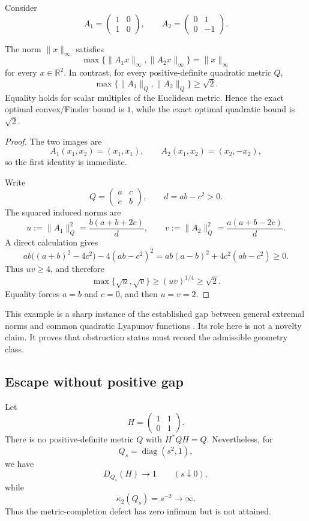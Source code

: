 Consider
\[
 A_1=\begin{pmatrix}1&0\\1&0\end{pmatrix},
 \qquad
 A_2=\begin{pmatrix}0&1\\0&-1\end{pmatrix}.
\]

\begin{theorem}
\label{thm:block19-convex-quadratic-separation}
The norm \(\|x\|_\infty\) satisfies
\[
 \max\{\|A_1x\|_\infty,\|A_2x\|_\infty\}
 =\|x\|_\infty
\]
for every \(x\in\mathbb R^2\).  In contrast, for every positive-definite quadratic metric \(Q\),
\[
 \max\{\|A_1\|_Q,\|A_2\|_Q\}\geq\sqrt2.
\]
Equality holds for scalar multiples of the Euclidean metric.  Hence the exact optimal convex/Finsler bound is \(1\), while the exact optimal quadratic bound is \(\sqrt2\).
\end{theorem}

\begin{proof}
The two images are
\[
 A_1(x_1,x_2)=(x_1,x_1),
 \qquad
 A_2(x_1,x_2)=(x_2,-x_2),
\]
so the first identity is immediate.

Write
\[
 Q=\begin{pmatrix}a&c\\c&b\end{pmatrix},
 \qquad
 d=ab-c^2>0.
\]
The squared induced norms are
\[
 u:=\|A_1\|_Q^2
 =\frac{b(a+b+2c)}{d},
 \qquad
 v:=\|A_2\|_Q^2
 =\frac{a(a+b-2c)}{d}.
\]
A direct calculation gives
\[
 ab\bigl((a+b)^2-4c^2\bigr)-4(ab-c^2)^2
 =ab(a-b)^2+4c^2(ab-c^2)\geq0.
\]
Thus \(uv\geq4\), and therefore
\[
 \max\{\sqrt u,\sqrt v\}\geq(uv)^{1/4}\geq\sqrt2.
\]
Equality forces \(a=b\) and \(c=0\), and then \(u=v=2\).
\end{proof}

This example is a sharp instance of the established gap between general extremal norms and common quadratic Lyapunov functions \cite{AndoShih1998,John1948}.  Its role here is not a novelty claim.  It proves that obstruction status must record the admissible geometry class.

\subsection{Escape without positive gap}
\label{subsec:block19-unipotent-escape}

\begin{proposition}
\label{prop:block19-unipotent-escape}
Let
\[
 H=\begin{pmatrix}1&1\\0&1\end{pmatrix}.
\]
There is no positive-definite metric \(Q\) with \(H^*QH=Q\).  Nevertheless, for
\[
 Q_s=\operatorname{diag}(s^2,1),
\]
we have
\[
 D_{Q_s}(H)\longrightarrow1
 \qquad(s\downarrow0),
\]
while
\[
 \kappa_2(Q_s)=s^{-2}\longrightarrow\infty.
\]
Thus the metric-completion defect has zero infimum but is not attained.
\end{proposition}

